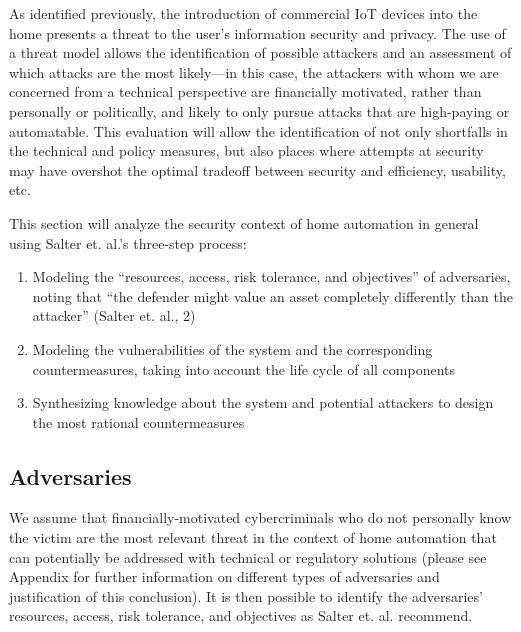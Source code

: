 As identified previously, the introduction of commercial IoT devices into the home presents a threat to the user’s information security and privacy. The use of a threat model allows the identification of possible attackers and an assessment of which attacks are the most likely---in this case, the attackers with whom we are concerned from a technical perspective are financially motivated, rather than personally or politically, and likely to only pursue attacks that are high-paying or automatable. This evaluation will allow the identification of not only shortfalls in the technical and policy measures, but also places where attempts at security may have overshot the optimal tradeoff between security and efficiency, usability, etc.

This section will analyze the security context of home automation in general using Salter et. al.’s three-step process:
\begin{enumerate}
\item Modeling the “resources, access, risk tolerance, and objectives” of adversaries, noting that “the defender might value an asset completely differently than the attacker” (Salter et. al., 2)
\item Modeling the vulnerabilities of the system and the corresponding countermeasures, taking into account the life cycle of all components
\item Synthesizing knowledge about the system and potential attackers to design the most rational countermeasures
\end{enumerate}

\subsection{Adversaries}

We assume that financially-motivated cybercriminals who do not personally know the victim are the most relevant threat in the context of home automation that can potentially be addressed with technical or regulatory solutions (please see Appendix for further information on different types of adversaries and justification of this conclusion). It is then possible to identify the adversaries’ resources, access, risk tolerance, and objectives as Salter et. al. recommend.

